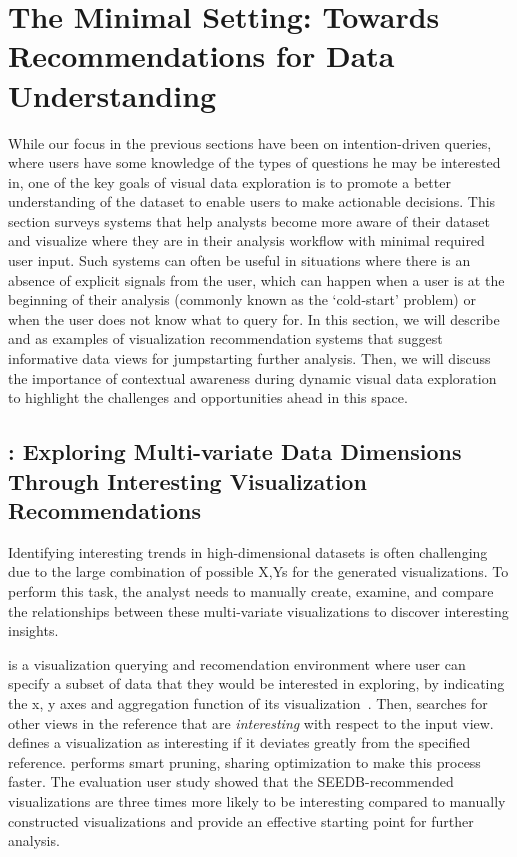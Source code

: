\section{The Minimal Setting: Towards Recommendations for Data Understanding}\label{sec:minimal}
\par While our focus in the previous sections have been on intention-driven queries, where users have some knowledge of the types of questions he may be interested in, one of the key goals of visual data exploration is to promote a better understanding of the dataset to enable users to make actionable decisions. This section surveys systems that help analysts become more aware of their dataset and visualize where they are in their analysis workflow with minimal required user input. Such systems can often be useful in situations where there is an absence of explicit signals from the user, which can happen when a user is at the beginning of their analysis (commonly known as the `cold-start' problem) or when the user does not know what to query for. In this section, we will describe \seedb and \sbd as examples of visualization recommendation systems that suggest informative data views for jumpstarting further analysis. Then, we will discuss the importance of contextual awareness during dynamic visual data exploration to highlight the challenges and opportunities ahead in this space.
\subsection{\seedb: Exploring Multi-variate Data Dimensions Through Interesting Visualization Recommendations}
\par Identifying interesting trends in high-dimensional datasets is often challenging due to the large combination of possible X,Ys for the generated visualizations. To perform this task, the analyst needs to manually create, examine, and compare the relationships between these multi-variate visualizations to discover interesting insights. 
\par \seedb is a visualization querying and recomendation environment where user can specify a subset of data that they would be interested in exploring, by indicating the x, y axes and aggregation function of its visualization~\cite{Vartak2015}. Then, \seedb searches for other views in the reference that are \textit{interesting} with respect to the input view. \seedb defines a visualization as interesting if it deviates greatly from the specified reference. \seedb performs smart pruning, sharing optimization to make this process faster. The evaluation user study showed that the SEEDB-recommended visualizations are three times more likely to be interesting compared to manually constructed visualizations and provide an effective starting point for further analysis.
